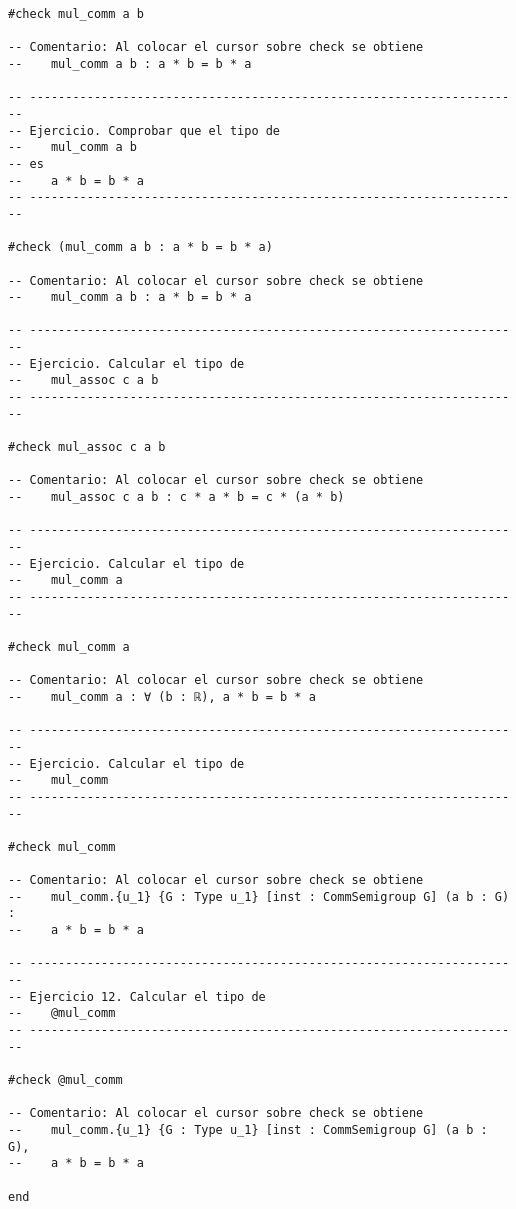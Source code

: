 \begin{verbatim}
#check mul_comm a b

-- Comentario: Al colocar el cursor sobre check se obtiene
--    mul_comm a b : a * b = b * a

-- ---------------------------------------------------------------------
-- Ejercicio. Comprobar que el tipo de
--    mul_comm a b
-- es
--    a * b = b * a
-- ---------------------------------------------------------------------

#check (mul_comm a b : a * b = b * a)

-- Comentario: Al colocar el cursor sobre check se obtiene
--    mul_comm a b : a * b = b * a

-- ---------------------------------------------------------------------
-- Ejercicio. Calcular el tipo de
--    mul_assoc c a b
-- ---------------------------------------------------------------------

#check mul_assoc c a b

-- Comentario: Al colocar el cursor sobre check se obtiene
--    mul_assoc c a b : c * a * b = c * (a * b)

-- ---------------------------------------------------------------------
-- Ejercicio. Calcular el tipo de
--    mul_comm a
-- ---------------------------------------------------------------------

#check mul_comm a

-- Comentario: Al colocar el cursor sobre check se obtiene
--    mul_comm a : ∀ (b : ℝ), a * b = b * a

-- ---------------------------------------------------------------------
-- Ejercicio. Calcular el tipo de
--    mul_comm
-- ---------------------------------------------------------------------

#check mul_comm

-- Comentario: Al colocar el cursor sobre check se obtiene
--    mul_comm.{u_1} {G : Type u_1} [inst : CommSemigroup G] (a b : G) :
--    a * b = b * a

-- ---------------------------------------------------------------------
-- Ejercicio 12. Calcular el tipo de
--    @mul_comm
-- ---------------------------------------------------------------------

#check @mul_comm

-- Comentario: Al colocar el cursor sobre check se obtiene
--    mul_comm.{u_1} {G : Type u_1} [inst : CommSemigroup G] (a b : G),
--    a * b = b * a

end
\end{verbatim}

